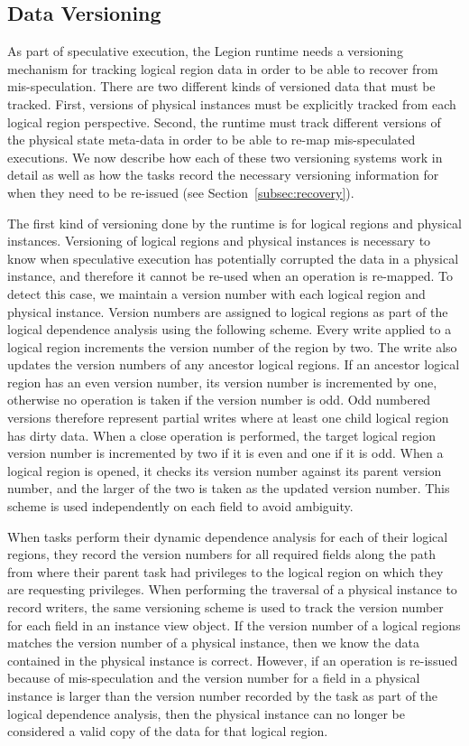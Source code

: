 \subsection{Data Versioning}
\label{subsec:versioning}
As part of speculative execution, the Legion runtime needs
a versioning mechanism for tracking logical region data
in order to be able to recover from mis-speculation. 
There are two different kinds of versioned data that must
be tracked. First, versions of physical instances must
be explicitly tracked from each logical region perspective.
Second, the runtime must track different versions of the
physical state meta-data in order to be able to re-map
mis-speculated executions. We now describe how each of
these two versioning systems work in detail as well as
how the tasks record the necessary versioning information
for when they need to be re-issued 
(see Section~\ref{subsec:recovery}).

The first kind of versioning done by the runtime is for 
logical regions and physical instances. Versioning of
logical regions and physical instances is necessary to 
know when speculative execution has potentially corrupted
the data in a physical instance, and therefore it cannot
be re-used when an operation is re-mapped. To detect this
case, we maintain a version number with each logical region
and physical instance. Version numbers are assigned to logical
regions as part of the logical dependence analysis using
the following scheme. Every write applied to a logical region
increments the version number of the region by two. The write
also updates the version numbers of any ancestor logical regions.
If an ancestor logical region has an even version number, its
version number is incremented by one, otherwise no operation
is taken if the version number is odd.
Odd numbered versions therefore represent partial writes
where at least one child logical region has dirty data.
When a close operation is performed, the target logical 
region version number is incremented by two if it is even
and one if it is odd. When a logical region is opened,
it checks its version number against its parent version
number, and the larger of the two is taken as the updated
version number. This scheme is used independently on each
field to avoid ambiguity.

When tasks perform their dynamic dependence analysis for
each of their logical regions, they record the version
numbers for all required fields along the path from where
their parent task had privileges to the logical region on
which they are requesting privileges. When performing 
the traversal of a physical instance to record writers,
the same versioning scheme is used to track the version
number for each field in an instance view object. If the
version number of a logical regions matches the version
number of a physical instance, then we know the data
contained in the physical instance is correct. However,
if an operation is re-issued because of mis-speculation
and the version number for a field in a physical instance 
is larger than the version number recorded by the task
as part of the logical dependence analysis, then the
physical instance can no longer be considered a valid
copy of the data for that logical region.

